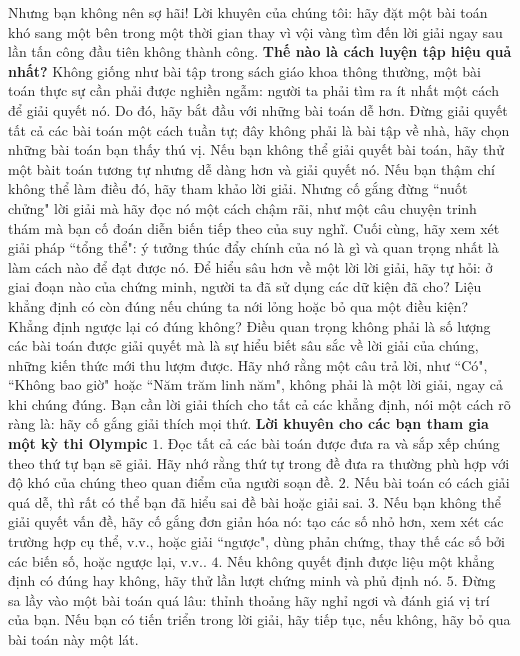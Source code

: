 \begin{multicols}{2}
	\vskip 0.1cm
	Nhưng bạn không nên sợ hãi! Lời khuyên của chúng tôi: hãy đặt một bài toán khó sang một bên trong một thời gian thay vì vội vàng tìm đến lời giải ngay sau lần tấn công đầu tiên không thành công.
	\vskip 0.1cm
	\textbf{\color{cackithi}Thế nào là cách luyện tập hiệu quả nhất?}
	\vskip 0.1cm
	Không giống như bài tập trong sách giáo khoa thông thường, một bài toán thực sự cần phải được nghiền ngẫm: người ta phải tìm ra ít nhất một cách để giải quyết nó. Do đó, hãy bắt đầu với những bài toán dễ hơn. Đừng giải quyết tất cả các bài toán một cách tuần tự; đây không phải là bài tập về nhà, hãy chọn những bài toán bạn thấy thú vị.  Nếu bạn không thể giải quyết bài toán, hãy thử một bàit toán tương tự nhưng dễ dàng hơn và giải quyết nó. Nếu bạn thậm chí không thể làm điều đó, hãy tham khảo lời giải. Nhưng cố gắng đừng ``nuốt chửng" lời giải mà hãy đọc nó một cách chậm rãi, như một câu chuyện trinh thám mà bạn cố đoán diễn biến tiếp theo của suy nghĩ. Cuối cùng, hãy xem xét giải pháp ``tổng thể": ý tưởng thúc đẩy chính của nó là gì và quan trọng nhất là làm cách nào để đạt được nó.
	\vskip 0.1cm
	Để hiểu sâu hơn về một lời lời giải, hãy tự hỏi: ở giai đoạn nào của chứng minh, người ta đã sử dụng các dữ kiện đã cho? Liệu khẳng định có còn đúng nếu chúng ta nới lỏng hoặc bỏ qua một điều kiện? Khẳng định ngược lại có đúng không? Điều quan trọng không phải là số lượng các bài toán được giải quyết mà là sự hiểu biết sâu sắc về lời giải của chúng, những kiến thức mới thu lượm được. 
	\vskip 0.1cm
	Hãy nhớ rằng một câu trả lời, như ``Có", ``Không bao giờ" hoặc ``Năm trăm linh năm", không phải là một lời giải, ngay cả khi chúng đúng. Bạn cần lời giải thích cho tất cả các khẳng định, nói một cách rõ ràng là: hãy cố gắng giải thích mọi thứ.  
	\vskip 0.1cm
	\textbf{\color{cackithi}Lời khuyên cho các bạn tham gia một kỳ thi Olympic}
	\vskip 0.1cm
	$1.$ Đọc tất cả các bài toán được đưa ra và sắp xếp chúng theo thứ tự bạn sẽ giải. Hãy nhớ rằng thứ tự trong đề đưa ra thường phù hợp với độ khó của chúng theo quan điểm của người soạn đề.
	\vskip 0.1cm
	$2.$ Nếu bài toán có cách giải quá dễ, thì rất có thể bạn đã hiểu sai đề bài hoặc giải sai.  
	\vskip 0.1cm
	$3.$ Nếu bạn không thể giải quyết vấn đề, hãy cố gắng đơn giản hóa nó: tạo các số nhỏ hơn, xem xét các trường hợp cụ thể, v.v., hoặc giải ``ngược", dùng phản chứng, thay thế các số bởi các biến số, hoặc ngược lại, \linebreak v.v..
	\vskip 0.1cm
	$4.$ Nếu không quyết định được liệu một khẳng định có đúng hay không, hãy thử lần lượt chứng minh và phủ định nó.
	\vskip 0.1cm
	$5.$ Đừng sa lầy vào một bài toán quá lâu: thỉnh thoảng hãy nghỉ ngơi và đánh giá vị trí của bạn. Nếu bạn có tiến triển trong lời giải, hãy tiếp tục, nếu không, hãy bỏ qua bài toán này một lát.

\end{multicols}
